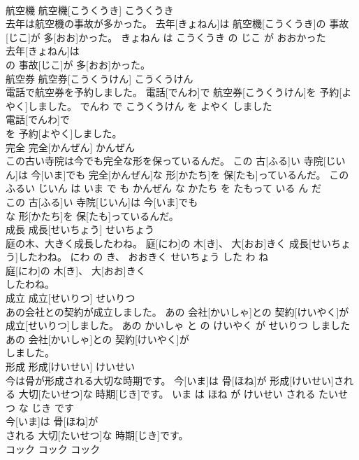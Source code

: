 \documentclass[8pt]{extreport}
\begin{document}
\begin{CJK}{UTF8}{min}
\\	航空機	航空機[こうくうき]	こうくうき	
\\	去年は航空機の事故が多かった。	去年[きょねん]は 航空機[こうくうき]の 事故[じこ]が 多[おお]かった。	きょねん は こうくうき の じこ が おおかった	
\\	去年[きょねん]は
\\	の 事故[じこ]が 多[おお]かった。			
\\	航空券	航空券[こうくうけん]	こうくうけん	
\\	電話で航空券を予約しました。	電話[でんわ]で 航空券[こうくうけん]を 予約[よやく]しました。	でんわ で こうくうけん を よやく しました	
\\	電話[でんわ]で
\\	を 予約[よやく]しました。			
\\	完全	完全[かんぜん]	かんぜん	
\\	この古い寺院は今でも完全な形を保っているんだ。	この 古[ふる]い 寺院[じいん]は 今[いま]でも 完全[かんぜん]な 形[かたち]を 保[たも]っているんだ。	この ふるい じいん は いま で も かんぜん な かたち を たもって いる ん だ	
\\	この 古[ふる]い 寺院[じいん]は 今[いま]でも
\\	な 形[かたち]を 保[たも]っているんだ。			
\\	成長	成長[せいちょう]	せいちょう	
\\	庭の木、大きく成長したわね。	庭[にわ]の 木[き]、 大[おお]きく 成長[せいちょう]したわね。	にわ の き、 おおきく せいちょう した わ ね	
\\	庭[にわ]の 木[き]、 大[おお]きく
\\	したわね。			
\\	成立	成立[せいりつ]	せいりつ	
\\	あの会社との契約が成立しました。	あの 会社[かいしゃ]との 契約[けいやく]が 成立[せいりつ]しました。	あの かいしゃ と の けいやく が せいりつ しました	
\\	あの 会社[かいしゃ]との 契約[けいやく]が
\\	しました。			
\\	形成	形成[けいせい]	けいせい	
\\	今は骨が形成される大切な時期です。	今[いま]は 骨[ほね]が 形成[けいせい]される 大切[たいせつ]な 時期[じき]です。	いま は ほね が けいせい される たいせつ な じき です	
\\	今[いま]は 骨[ほね]が
\\	される 大切[たいせつ]な 時期[じき]です。			
\\	コック	コック	コック	

\end{CJK}
\end{document}
